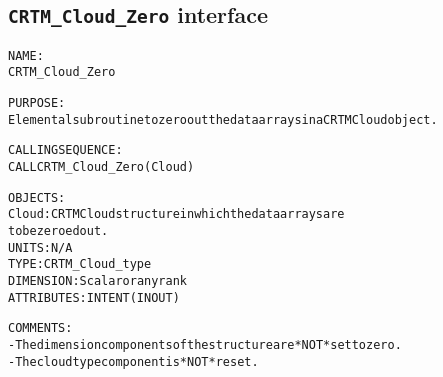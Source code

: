 \subsection{\texttt{CRTM\_Cloud\_Zero} interface}
  \label{sec:CRTM_Cloud_Zero_interface}
  \begin{alltt}
 
  NAME:
        CRTM_Cloud_Zero
 
  PURPOSE:
        Elemental subroutine to zero out the data arrays in a CRTM Cloud object.
 
  CALLING SEQUENCE:
        CALL CRTM_Cloud_Zero( Cloud )
 
  OBJECTS:
        Cloud:         CRTM Cloud structure in which the data arrays are
                       to be zeroed out.
                       UNITS:      N/A
                       TYPE:       CRTM_Cloud_type
                       DIMENSION:  Scalar or any rank
                       ATTRIBUTES: INTENT(IN OUT)
 
  COMMENTS:
        - The dimension components of the structure are *NOT* set to zero.
        - The cloud type component is *NOT* reset.
 
  \end{alltt}
